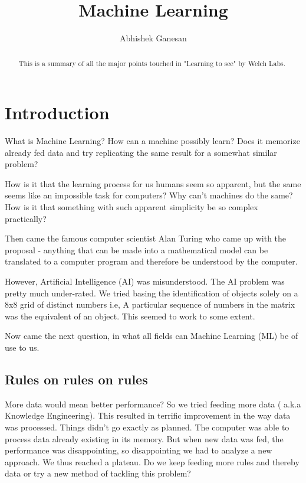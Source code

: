 \documentclass[a4paper]{article}
\title{Machine Learning}
\author{Abhishek Ganesan}
\begin{document}
\maketitle

\begin{abstract}
This is a summary of all the major points touched in "Learning to see" by Welch Labs.

\end{abstract}

\section{Introduction}

What is Machine Learning? How can a machine possibly learn? Does it memorize already fed data and try replicating the same result for a somewhat similar problem?

How is it that the learning process for us humans seem so apparent, but the same seems like an impossible task for computers? Why can't machines do the same?  How is it that something with such apparent simplicity be so complex practically?

Then came the famous computer scientist Alan Turing who came up with the proposal - anything that can be made into a mathematical model can be translated to a computer program and therefore be understood by the computer. 

However, Artificial Intelligence (AI) was misunderstood. The AI problem was pretty much under-rated. We tried basing the identification of objects solely on a 8x8 grid of  distinct numbers i.e, A particular sequence of numbers in the matrix was the equivalent of an object.
This seemed to work to some extent. 

Now came the next question, in what all fields can Machine Learning (ML) be of use to us.
\subsection{Rules on rules on rules}
More data would mean better performance? So we tried feeding more data ( a.k.a Knowledge Engineering). This resulted in terrific improvement  in the way data was processed. Things didn't go exactly as planned. The computer was able to process data already existing in its memory. But when new data was fed, the performance was disappointing, so disappointing we had to analyze a new approach. 
We thus reached a plateau. Do we keep feeding more rules and thereby data or try a new method of tackling this problem? 
\end{document}
